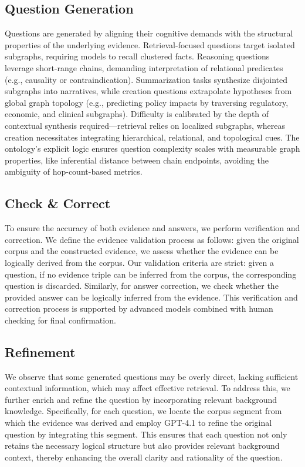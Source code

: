 \documentclass{article} %
\begin{document}
\subsection{Question Generation}
Questions are generated by aligning their cognitive demands with the structural properties of the underlying evidence. Retrieval-focused questions target isolated subgraphs, requiring models to recall clustered facts. Reasoning questions leverage short-range chains, demanding interpretation of relational predicates (e.g., causality or contraindication). Summarization tasks synthesize disjointed subgraphs into narratives, while creation questions extrapolate hypotheses from global graph topology (e.g., predicting policy impacts by traversing regulatory, economic, and clinical subgraphs). Difficulty is calibrated by the depth of contextual synthesis required—retrieval relies on localized subgraphs, whereas creation necessitates integrating hierarchical, relational, and topological cues. The ontology’s explicit logic ensures question complexity scales with measurable graph properties, like inferential distance between chain endpoints, avoiding the ambiguity of hop-count-based metrics.

\subsection{Check \& Correct}
To ensure the accuracy of both evidence and answers, we perform verification and correction. We define the evidence validation process as follows: given the original corpus and the constructed evidence, we assess whether the evidence can be logically derived from the corpus. Our validation criteria are strict: given a question, if no evidence triple can be inferred from the corpus, the corresponding question is discarded. Similarly, for answer correction, we check whether the provided answer can be logically inferred from the evidence. This verification and correction process is supported by advanced models combined with human checking for final confirmation.

\subsection{Refinement}
We observe that some generated questions may be overly direct, lacking sufficient contextual information, which may affect effective retrieval. To address this, we further enrich and refine the question by incorporating relevant background knowledge. Specifically, for each question, we locate the corpus segment from which the evidence was derived and employ GPT-4.1 to refine the original question by integrating this segment. This ensures that each question not only retains the necessary logical structure but also provides relevant background context, thereby enhancing the overall clarity and rationality of the question.
\end{document}
